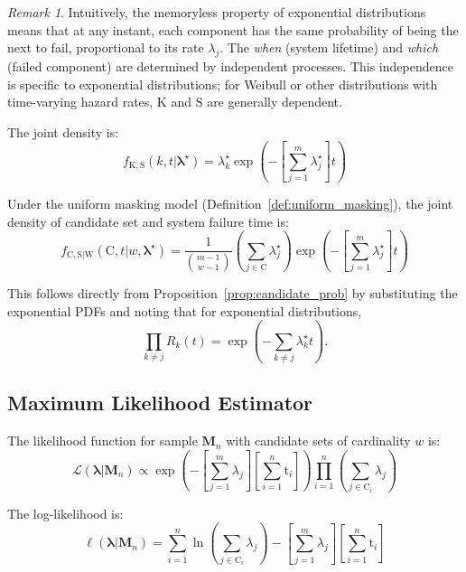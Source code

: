 \documentclass[12pt]{article}
\newcommand{\RV}[1]{\mathrm{#1}}
\newcommand{\sv}{\RV{S}}           %
\newcommand{\cand}{\RV{C}}         %
\newcommand{\rvcand}{\RV{C}}       %
\newcommand{\ti}{\mathrm{t}}       %
\newcommand{\tparam}[1]{{#1}^{\star}}  %
\newcommand{\likelihood}{\mathcal{L}}
\newcommand{\mfs}{\mathbf{M}_n}
\newcommand{\pdf}{f}
\newcommand{\srv}{R}
\renewcommand{\vec}[1]{\boldsymbol{#1}}
\theoremstyle{definition}
\theoremstyle{remark}
\newtheorem{remark}[theorem]{Remark}
\begin{document}
\begin{remark}
Intuitively, the memoryless property of exponential distributions means that at any instant, each component has the same probability of being the next to fail, proportional to its rate $\lambda_j$. The \emph{when} (system lifetime) and \emph{which} (failed component) are determined by independent processes. This independence is specific to exponential distributions; for Weibull or other distributions with time-varying hazard rates, $\RV{K}$ and $\sv$ are generally dependent.
\end{remark}

The joint density is:
\begin{equation}
\label{eq:expo_joint}
\pdf_{\RV{K}, \sv}(k, t | \tparam{\vec{\lambda}}) = \tparam{\lambda}_k \exp\left(-\left[\sum_{j=1}^{m} \tparam{\lambda}_j\right] t\right)
\end{equation}

Under the uniform masking model (Definition~\ref{def:uniform_masking}), the joint density of candidate set and system failure time is:
\begin{equation}
\label{eq:expo_masked_joint}
\pdf_{\rvcand, \sv | \RV{W}}(\cand, t | w, \tparam{\vec{\lambda}}) = \frac{1}{\binom{m-1}{w-1}} \left(\sum_{j \in \cand} \tparam{\lambda}_j\right) \exp\left(-\left[\sum_{j=1}^{m} \tparam{\lambda}_j\right] t\right)
\end{equation}

This follows directly from Proposition~\ref{prop:candidate_prob} by substituting the exponential PDFs and noting that for exponential distributions,
\[
\prod_{k \neq j} \srv_k(t) = \exp\!\left(-\sum_{k \neq j} \tparam{\lambda}_k t\right).
\]

\subsection{Maximum Likelihood Estimator}

The likelihood function for sample $\mfs$ with candidate sets of cardinality $w$ is:
\begin{equation}
\label{eq:expo_likelihood}
\likelihood(\vec{\lambda} | \mfs) \propto \exp\left(-\left[\sum_{j=1}^{m} \lambda_j\right] \left[\sum_{i=1}^{n} \ti_i\right]\right) \prod_{i=1}^{n} \left(\sum_{j \in \cand_i} \lambda_j\right)
\end{equation}

The log-likelihood is:
\begin{equation}
\label{eq:expo_loglik}
\ell(\vec{\lambda} | \mfs) = \sum_{i=1}^{n} \ln\left(\sum_{j \in \cand_i} \lambda_j\right) - \left[\sum_{j=1}^{m} \lambda_j\right] \left[\sum_{i=1}^{n} \ti_i\right]
\end{equation}
\end{document}
